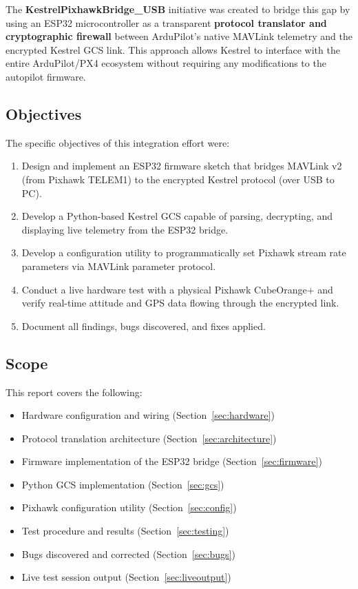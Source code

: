 \documentclass[11pt,a4paper]{article}
\begin{document}
The \textbf{KestrelPixhawkBridge\_USB} initiative was created to bridge this
gap by using an ESP32 microcontroller as a transparent \textbf{protocol
translator and cryptographic firewall} between ArduPilot's native MAVLink
telemetry and the encrypted Kestrel GCS link. This approach allows Kestrel to
interface with the entire ArduPilot/PX4 ecosystem without requiring any
modifications to the autopilot firmware.

\subsection{Objectives}

The specific objectives of this integration effort were:

\begin{enumerate}
    \item Design and implement an ESP32 firmware sketch that bridges MAVLink v2
          (from Pixhawk TELEM1) to the encrypted Kestrel protocol (over USB to PC).
    \item Develop a Python-based Kestrel GCS capable of parsing, decrypting, and
          displaying live telemetry from the ESP32 bridge.
    \item Develop a configuration utility to programmatically set Pixhawk stream
          rate parameters via MAVLink parameter protocol.
    \item Conduct a live hardware test with a physical Pixhawk CubeOrange+ and
          verify real-time attitude and GPS data flowing through the encrypted link.
    \item Document all findings, bugs discovered, and fixes applied.
\end{enumerate}

\subsection{Scope}

This report covers the following:
\begin{itemize}[noitemsep]
    \item Hardware configuration and wiring (Section~\ref{sec:hardware})
    \item Protocol translation architecture (Section~\ref{sec:architecture})
    \item Firmware implementation of the ESP32 bridge (Section~\ref{sec:firmware})
    \item Python GCS implementation (Section~\ref{sec:gcs})
    \item Pixhawk configuration utility (Section~\ref{sec:config})
    \item Test procedure and results (Section~\ref{sec:testing})
    \item Bugs discovered and corrected (Section~\ref{sec:bugs})
    \item Live test session output (Section~\ref{sec:liveoutput})
\end{itemize}
\end{document}
